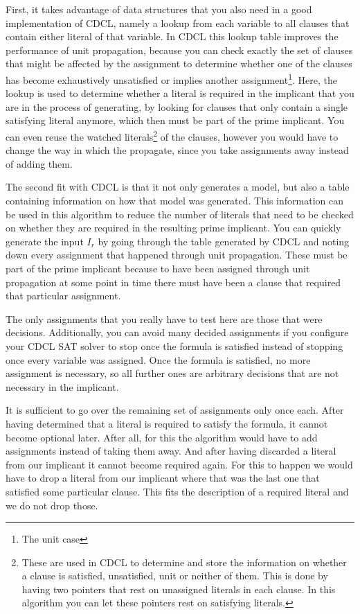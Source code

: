 First, it takes advantage of data structures that you also need in a good implementation of CDCL, namely a lookup from each variable to all clauses that contain either literal of that variable. In CDCL this lookup table improves the performance of unit propagation, because you can check exactly the set of clauses that might be affected by the assignment to determine whether one of the clauses has become exhaustively unsatisfied or implies another assignment\footnote{The unit case}. Here, the lookup is used to determine whether a literal is required in the implicant that you are in the process of generating, by looking for clauses that only contain a single satisfying literal anymore, which then must be part of the prime implicant. You can even reuse the watched literals\footnote{
	These are used in CDCL to determine and store the information on whether a clause is satisfied, unsatisfied, unit or neither of them. This is done by having two pointers that rest on unassigned literals in each clause. In this algorithm you can let these pointers rest on satisfying literals.}
 of the clauses, however you would have to change the way in which the propagate, since you take assignments away instead of adding them.

The second fit with CDCL is that it not only generates a model, but also a table containing information on how that model was generated. This information can be used in this algorithm to reduce the number of literals that need to be checked on whether they are required in the resulting prime implicant. You can quickly generate the input $I_r$ by going through the table generated by CDCL and noting down every assignment that happened through unit propagation. These must be part of the prime implicant because to have been assigned through unit propagation at some point in time there must have been a clause that required that particular assignment. 

The only assignments that you really have to test here are those that were decisions. Additionally, you can avoid many decided assignments if you configure your CDCL SAT solver to stop once the formula is satisfied instead of stopping once every variable was assigned. Once the formula is satisfied, no more assignment is necessary, so all further ones are arbitrary decisions that are not necessary in the implicant. 

It is sufficient to go over the remaining set of assignments only once each. After having determined that a literal is required to satisfy the formula, it cannot become optional later. After all, for this the algorithm would have to add assignments instead of taking them away. And after having discarded a literal from our implicant it cannot become required again. For this to happen we would have to drop a literal from our implicant where that was the last one that satisfied some particular clause. This fits the description of a required literal and we do not drop those.

